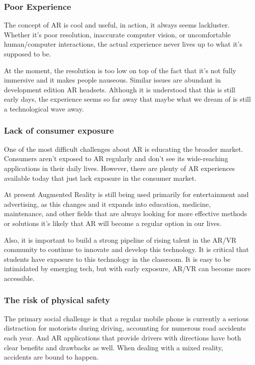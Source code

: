 \documentclass[BTech]{srmuthesis}
\begin{document}
\subsubsection{Poor Experience} The concept of AR is cool and useful, in action, it always seems lackluster. Whether it's poor resolution, inaccurate computer vision, or uncomfortable human/computer interactions, the actual experience never lives up to what it's supposed to be.

At the moment, the resolution is too low on top of the fact that it's not fully immersive and it makes people nauseous. Similar issues are abundant in development edition AR headsets. Although it is understood that this is still early days, the experience seems so far away that maybe what we dream of is still a technological wave away.


\subsubsection{Lack of consumer exposure}
One of the most difficult challenges about AR is educating the broader market.  Consumers aren't exposed to AR regularly and don't see its wide-reaching applications in their daily lives. However, there are plenty of AR experiences available today that just lack exposure in the consumer market.  

At present Augmented Reality is still being used primarily for entertainment and advertising, as this changes and it expands into education, medicine, maintenance, and other fields that are always looking for more effective methods or solutions it's likely that AR will become a regular option in our lives.

Also, it is important to build a strong pipeline of rising talent in the AR/VR community to continue to innovate and develop this technology. It is critical that students have exposure to this technology in the classroom. It is easy to be intimidated by emerging tech, but with early exposure, AR/VR can become more accessible.  
\subsubsection{The risk of physical safety}
The primary social challenge is that a regular mobile phone is currently a serious distraction for motorists during driving, accounting for numerous road accidents each year. And AR applications that provide drivers with directions have both clear benefits and drawbacks as well. When dealing with a mixed reality, accidents are bound to happen.
\end{document}
